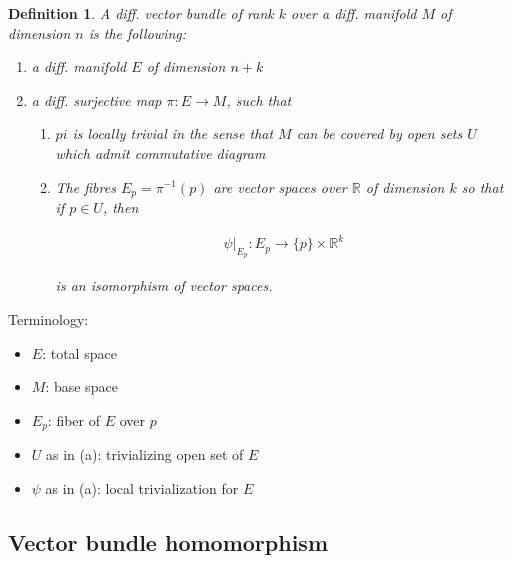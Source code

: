 \documentclass{scrartcl}
\newcommand{\R}{\mathbb R}
\newtheorem*{mydef}{Definition}
\begin{document}
\begin{mydef}
  A diff. \emph{vector bundle} of rank $k$ over a diff. manifold $M$ of dimension $n$ is the following:

  \begin{enumerate}
  \item a diff. manifold $E$ of dimension $n+k$
  \item a diff. surjective map $\pi:E\rightarrow M$, such that 
    \begin{enumerate}
    \item $pi$ is locally trivial in the sense that $M$ can be covered by open sets $U$ which admit commutative diagram

    \item The fibres $E_p = \pi^{-1}(p)$ are vector spaces over $\R$ of dimension $k$ so that if $p\in U$, then

      \begin{align}
        \psi|_{E_p} : E_p \rightarrow \{p\}\times\R^k
      \end{align}

      is an isomorphism of vector spaces.
    \end{enumerate}
  \end{enumerate}
\end{mydef}

Terminology:

\begin{itemize}
\item $E$: total space
\item $M$: base space
\item $E_p$: fiber of $E$ over $p$
\item $U$ as in (a): trivializing open set of $E$
\item $\psi$ as in (a): local trivialization for $E$
\end{itemize}

\subsection{Vector bundle homomorphism}
\end{document}
